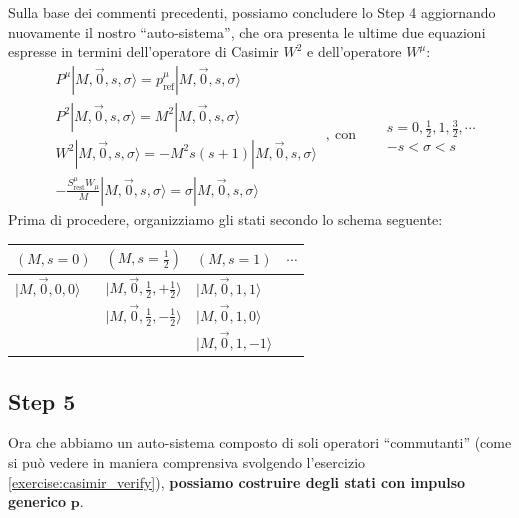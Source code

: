 \documentclass[../main.tex]{subfiles}
\begin{document}
Sulla base dei commenti precedenti, possiamo concludere lo Step 4 aggiornando nuovamente il nostro “auto-sistema”, che ora presenta le ultime due equazioni espresse in termini dell'operatore di Casimir $W^2$ e dell'operatore $W^\mu$:
\[
\boxed{
    \begin{aligned}
        &P^\mu|M, \Vec{0}, s, \sigma\rangle = p^\mu_\text{ref}|M, \Vec{0}, s, \sigma\rangle\\
        &P^2|M, \Vec{0}, s, \sigma\rangle = M^2|M, \Vec{0}, s, \sigma\rangle\\
        &W^2|M, \Vec{0}, s, \sigma\rangle = -M^2 s(s+1)|M, \Vec{0}, s, \sigma\rangle\\
        &-\frac{S^\mu_\text{rest}W_\mu}{M}|M, \Vec{0}, s, \sigma\rangle = \sigma|M, \Vec{0}, s, \sigma\rangle
    \end{aligned}
}~,~ \text{con} \quad
\begin{aligned}
    &s=0,\frac{1}{2},1,\frac{3}{2},\cdots\\
    &-s<\sigma<s
\end{aligned}
\]
Prima di procedere, organizziamo gli stati secondo lo schema seguente:

\begin{center}
    \begin{tabular}{l|l|l|l}
    $(M, s=0)$                      &   $(M, s=\frac{1}{2})$            &   $(M, s=1)$                      & $\cdots$  \\
    \hline
    \(|M, \Vec{0}, 0, 0\rangle\)    &   \(|M, \Vec{0}, \frac{1}{2}, +\frac{1}{2}\rangle\)    &   \(|M, \Vec{0}, 1, 1\rangle\)    & \\
                                    &   \(|M, \Vec{0}, \frac{1}{2}, -\frac{1}{2}\rangle\)    &   \(|M, \Vec{0}, 1, 0\rangle\)    & \\
                                    &                                                        &   \(|M, \Vec{0}, 1, -1\rangle\)   & \\
    \end{tabular}
\end{center}

\subsection{Step 5}
Ora che abbiamo un auto-sistema composto di soli operatori “commutanti” (come si può vedere in maniera comprensiva svolgendo l'esercizio \ref{exercise:casimir_verify}), \textbf{possiamo costruire degli stati con impulso generico} $\mathbf{p}$.
\end{document}
